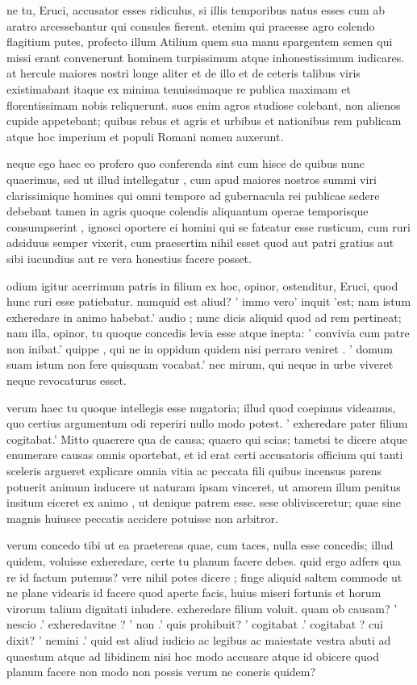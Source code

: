  ne tu, Eruci, accusator esses ridiculus, si illis temporibus natus esses cum ab aratro arcessebantur qui consules fierent. etenim qui praeesse agro colendo flagitium putes, profecto illum Atilium quem sua manu spargentem semen qui missi erant convenerunt hominem turpissimum atque inhonestissimum iudicares. at hercule maiores nostri longe aliter et de illo et de ceteris talibus viris existimabant itaque ex minima tenuissimaque re publica maximam et florentissimam nobis reliquerunt. suos enim agros studiose colebant, non alienos cupide appetebant; quibus rebus et agris et urbibus et nationibus rem publicam atque hoc imperium et populi Romani nomen auxerunt.

 neque ego haec eo profero quo conferenda sint cum hisce de quibus nunc quaerimus, sed ut illud intellegatur , cum apud maiores nostros summi viri clarissimique homines qui omni tempore ad gubernacula rei publicae sedere debebant tamen in agris quoque colendis aliquantum operae temporisque consumpserint , ignosci oportere ei homini qui se fateatur esse rusticum, cum ruri adsiduus semper vixerit, cum praesertim nihil esset quod aut patri gratius aut sibi iucundius aut re vera honestius facere posset.

 odium igitur acerrimum patris in filium ex hoc, opinor, ostenditur, Eruci, quod hunc ruri esse patiebatur. numquid est aliud? ' immo vero' inquit 'est; nam istum exheredare in animo habebat.' audio ; nunc dicis aliquid quod ad rem pertineat; nam illa, opinor, tu quoque concedis levia esse atque inepta: ' convivia cum patre non inibat.' quippe , qui ne in oppidum quidem nisi perraro veniret . ' domum suam istum non fere quisquam vocabat.' nec mirum, qui neque in urbe viveret neque revocaturus esset.

 verum haec tu quoque intellegis esse nugatoria; illud quod coepimus videamus, quo certius argumentum odi reperiri nullo modo potest. ' exheredare pater filium cogitabat.' Mitto quaerere qua de causa; quaero qui scias; tametsi te dicere atque enumerare causas omnis oportebat, et id erat certi accusatoris officium qui tanti sceleris argueret explicare omnia vitia ac peccata fili quibus incensus parens potuerit animum inducere ut naturam ipsam vinceret, ut amorem illum penitus insitum eiceret ex animo , ut denique patrem esse. sese oblivisceretur; quae sine magnis huiusce peccatis accidere potuisse non arbitror.

 verum concedo tibi ut ea praetereas quae, cum taces, nulla esse concedis; illud quidem, voluisse exheredare, certe tu planum facere debes. quid ergo adfers qua re id factum putemus? vere nihil potes dicere ; finge aliquid saltem commode ut ne plane videaris id facere quod aperte facis, huius miseri fortunis et horum virorum talium dignitati inludere. exheredare filium voluit. quam ob causam? ' nescio .' exheredavitne ? ' non .' quis prohibuit? ' cogitabat .' cogitabat ? cui dixit? ' nemini .' quid est aliud iudicio ac legibus ac maiestate vestra abuti ad quaestum atque ad libidinem nisi hoc modo accusare atque id obicere quod planum facere non modo non possis verum ne coneris quidem?

